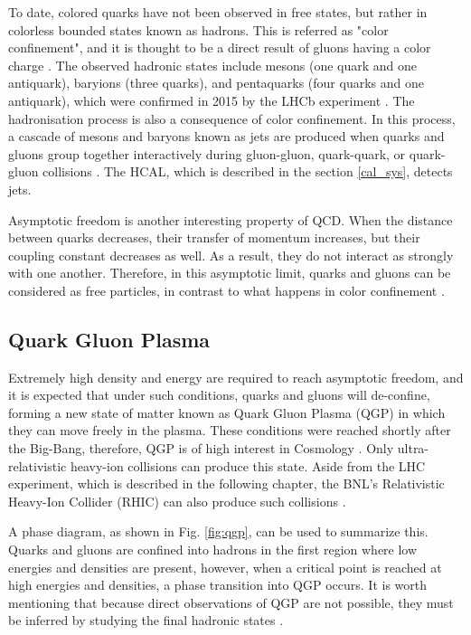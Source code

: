 To date, colored quarks have not been observed in free states, but rather in colorless bounded states known as hadrons. This is referred as "color confinement", and it is thought to be a direct result of gluons having a color charge \cite{di2020measurement, thomson2013modern}. The observed hadronic states include mesons (one quark and one antiquark), baryions (three quarks), and pentaquarks (four quarks and one antiquark), which were confirmed in 2015 by the LHCb experiment \cite{aaij2015observation}. The hadronisation process is also a consequence of color confinement.  In this process, a cascade of mesons and baryons known as jets are produced when quarks and gluons group together interactively during gluon-gluon, quark-quark, or quark-gluon collisions \cite{di2020measurement, baron2018desarrollo}.  The HCAL, which is described in the section \ref{cal_sys}, detects jets.

Asymptotic freedom is another interesting property of QCD. When the distance between quarks decreases, their transfer of momentum increases, but their coupling constant decreases as well. As a result, they do not interact as strongly with one another. Therefore, in this asymptotic limit, quarks and gluons can be considered as free particles, in contrast to what happens in color confinement \cite{danilov2020measurement, di2020measurement, sanchez2020search}. 

\subsection{Quark Gluon Plasma}
Extremely high density and energy are required to reach asymptotic freedom, and it is expected that under such conditions, quarks and gluons will de-confine, forming a new state of matter known as Quark Gluon Plasma (QGP) in which they can move freely in the plasma. These conditions were reached shortly after the Big-Bang, therefore, QGP is of high interest in Cosmology \cite{aziz2021z}. Only ultra-relativistic heavy-ion collisions can produce this state. Aside from the LHC experiment, which is described in the following chapter, the BNL's Relativistic Heavy-Ion Collider (RHIC) can also produce such collisions \cite{villatorodetection}. 

A phase diagram, as shown in Fig. \ref{fig:qgp}, can be used to summarize this. Quarks and gluons are confined into hadrons in the first region where low energies and densities are present, however, when a critical point is reached at high energies and densities, a phase transition into QGP occurs. It is worth mentioning that because direct observations of QGP are not possible, they must be inferred by studying the final hadronic states \cite{villatorodetection, parkkila2021quantifying}.

